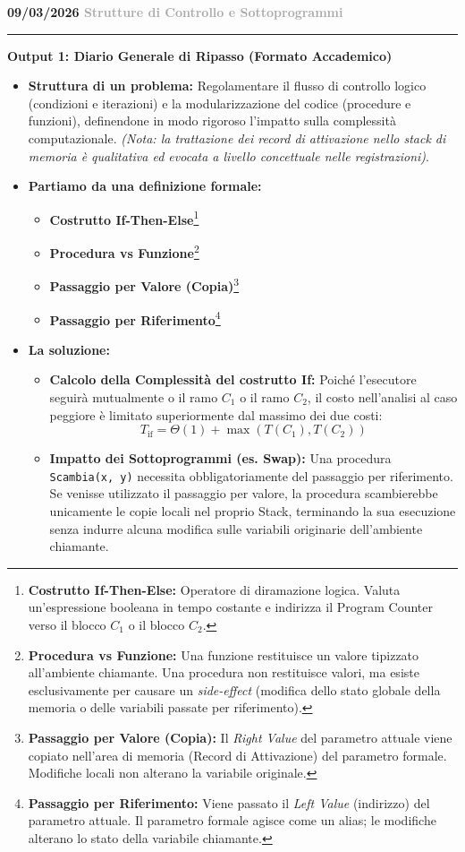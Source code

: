 \documentclass[a4paper, 11pt]{report}
\newcommand{\lezione}[2]{
\vspace{2em}
\noindent\textbf{\Large #1 \hfill \textcolor{darkgray}{#2}}
\vspace{0.5em}
\hrule
\vspace{1.5em}
}
\newcommand{\definizione}[2]{%
\textbf{#1}\footnote{\textbf{#1:} #2}%
}
\begin{document}
\lezione{09/03/2026}{Strutture di Controllo e Sottoprogrammi}
\vspace{0.5cm}
\textbf{Output 1: Diario Generale di Ripasso (Formato Accademico)}
\begin{itemize}
\item \textbf{Struttura di un problema:}
Regolamentare il flusso di controllo logico (condizioni e iterazioni) e la modularizzazione del codice (procedure e funzioni), definendone in modo rigoroso l'impatto sulla complessità computazionale. \textit{(Nota: la trattazione dei record di attivazione nello stack di memoria è qualitativa ed evocata a livello concettuale nelle registrazioni)}.

\item \textbf{Partiamo da una definizione formale:}
\begin{itemize}
    \item \definizione{Costrutto If-Then-Else}{Operatore di diramazione logica. Valuta un'espressione booleana in tempo costante e indirizza il Program Counter verso il blocco $C_1$ o il blocco $C_2$.}
    \item \definizione{Procedura vs Funzione}{Una funzione restituisce un valore tipizzato all'ambiente chiamante. Una procedura non restituisce valori, ma esiste esclusivamente per causare un \textit{side-effect} (modifica dello stato globale della memoria o delle variabili passate per riferimento).}
    \item \definizione{Passaggio per Valore (Copia)}{Il \textit{Right Value} del parametro attuale viene copiato nell'area di memoria (Record di Attivazione) del parametro formale. Modifiche locali non alterano la variabile originale.}
    \item \definizione{Passaggio per Riferimento}{Viene passato il \textit{Left Value} (indirizzo) del parametro attuale. Il parametro formale agisce come un alias; le modifiche alterano lo stato della variabile chiamante.}
\end{itemize}

\item \textbf{La soluzione:}
\begin{itemize}
    \item \textbf{Calcolo della Complessità del costrutto If:} Poiché l'esecutore seguirà mutualmente o il ramo $C_1$ o il ramo $C_2$, il costo nell'analisi al caso peggiore è limitato superiormente dal massimo dei due costi:
    \[ T_{\text{if}} = \Theta(1) + \max(T(C_1), T(C_2)) \]
    \item \textbf{Impatto dei Sottoprogrammi (es. Swap):} Una procedura \texttt{Scambia(x, y)} necessita obbligatoriamente del passaggio per riferimento. Se venisse utilizzato il passaggio per valore, la procedura scambierebbe unicamente le copie locali nel proprio Stack, terminando la sua esecuzione senza indurre alcuna modifica sulle variabili originarie dell'ambiente chiamante.
\end{itemize}
\end{itemize}
\end{document}
